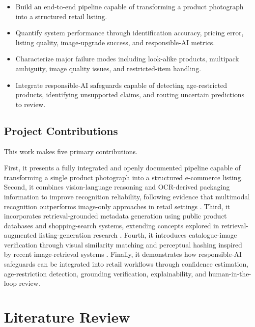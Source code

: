 \documentclass[conference]{IEEEtran}
\begin{document}
\begin{itemize}

\item Build an end-to-end pipeline capable of transforming a product photograph into a structured retail listing.

\item Quantify system performance through identification accuracy, pricing error, listing quality, image-upgrade success, and responsible-AI metrics.

\item Characterize major failure modes including look-alike products, multipack ambiguity, image quality issues, and restricted-item handling.

\item Integrate responsible-AI safeguards capable of detecting age-restricted products, identifying unsupported claims, and routing uncertain predictions to review.

\end{itemize}

\subsection{Project Contributions}

This work makes five primary contributions.

First, it presents a fully integrated and openly documented pipeline capable of transforming a single product photograph into a structured e-commerce listing. Second, it combines vision-language reasoning and OCR-derived packaging information to improve recognition reliability, following evidence that multimodal recognition outperforms image-only approaches in retail settings \cite{ocrfusion2023}. Third, it incorporates retrieval-grounded metadata generation using public product databases and shopping-search systems, extending concepts explored in retrieval-augmented listing-generation research \cite{li2024modict}. Fourth, it introduces catalogue-image verification through visual similarity matching and perceptual hashing inspired by recent image-retrieval systems \cite{sir2020,eclip2022}. Finally, it demonstrates how responsible-AI safeguards can be integrated into retail workflows through confidence estimation, age-restriction detection, grounding verification, explainability, and human-in-the-loop review.


\section{Literature Review}
%
%
\end{document}
